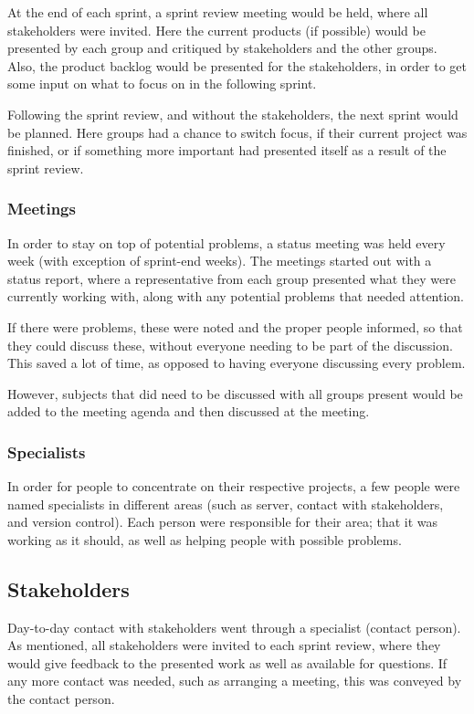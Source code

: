 At the end of each sprint, a sprint review meeting would be held, where all stakeholders were invited.
Here the current products (if possible) would be presented by each group and critiqued by stakeholders and the other groups.
Also, the product backlog would be presented for the stakeholders, in order to get some input on what to focus on in the following sprint.

Following the sprint review, and without the stakeholders, the next sprint would be planned.
Here groups had a chance to switch focus, if their current project was finished, or if something more important had presented itself as a result of the sprint review.

\subsubsection{Meetings}
In order to stay on top of potential problems, a status meeting was held every week (with exception of sprint-end weeks).
The meetings started out with a status report, where a representative from each group presented what they were currently working with, along with any potential problems that needed attention.

If there were problems, these were noted and the proper people informed, so that they could discuss these, without everyone needing to be part of the discussion.
This saved a lot of time, as opposed to having everyone discussing every problem.

However, subjects that did need to be discussed with all groups present would be added to the meeting agenda and then discussed at the meeting.

\subsubsection{Specialists}
In order for people to concentrate on their respective projects, a few people were named specialists in different areas (such as server, contact with stakeholders, and version control).
Each person were responsible for their area; that it was working as it should, as well as helping people with possible problems.

\subsection{Stakeholders}
Day-to-day contact with stakeholders went through a specialist (contact person).
As mentioned, all stakeholders were invited to each sprint review, where they would give feedback to the presented work as well as available for questions.
If any more contact was needed, such as arranging a meeting, this was conveyed by the contact person.

